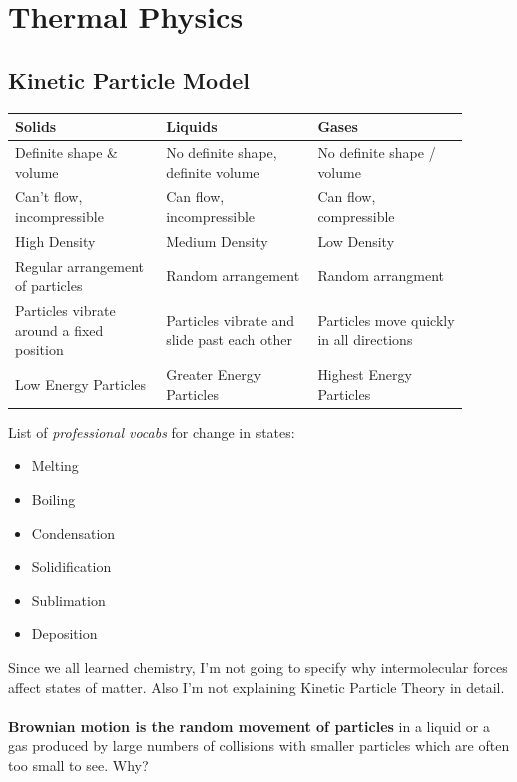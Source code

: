 \documentclass[a4paper,12pt]{article}
\begin{document}
\section{Thermal Physics}
\subsection{Kinetic Particle Model}
\begin{center}
    \begin{tabular}{|>{\centering\arraybackslash}p{0.3\linewidth}|>{\centering\arraybackslash}p{0.3\linewidth}|>{\centering\arraybackslash}p{0.3\linewidth}|}\hline
         \textbf{Solids}& \textbf{Liquids}& \textbf{Gases}\\\hline
         Definite shape \& volume&  No definite shape, definite volume& No definite shape / volume\\\hline
         Can't flow, incompressible&  Can flow, incompressible& Can flow, compressible\\\hline
         High Density& Medium Density & Low Density\\\hline
         Regular arrangement of particles & Random arrangement & Random arrangment\\\hline
         Particles vibrate around a fixed position & Particles vibrate and slide past each other & Particles move quickly in all directions \\\hline
         Low Energy Particles & Greater Energy Particles & Highest Energy Particles\\\hline
    \end{tabular}
\end{center}
List of \textit{professional vocabs} for change in states:
\begin{itemize}
    \item Melting
    \item Boiling
    \item Condensation
    \item Solidification
    \item Sublimation
    \item Deposition
\end{itemize}
Since we all learned chemistry, I'm not going to specify why intermolecular forces affect states of matter. Also I'm not explaining Kinetic Particle Theory in detail.\\\\
\textbf{Brownian motion is the random movement of particles} in a liquid or a gas produced by large numbers of collisions with smaller particles which are often too small to see. Why?
\end{document}
